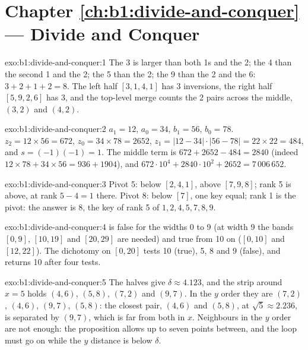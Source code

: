 \section*{Chapter \ref{ch:b1:divide-and-conquer} --- Divide and Conquer}

\begin{solution}{exo:b1:divide-and-conquer:1}
The 3 is larger than both 1s and the 2; the 4 than the second 1 and the 2; the 5 than the 2; the 9 than the 2 and the 6:
$3 + 2 + 1 + 2 = 8$. The left half $[3, 1, 4, 1]$ has 3 inversions, the right half $[5, 9, 2, 6]$ has 3, and the
top-level merge counts the 2 pairs across the middle, $(3, 2)$ and $(4, 2)$.
\end{solution}

\begin{solution}{exo:b1:divide-and-conquer:2}
$a_1 = 12$, $a_0 = 34$, $b_1 = 56$, $b_0 = 78$. $z_2 = 12 \times 56 = 672$, $z_0 = 34 \times 78 = 2652$, $z_1 = |12 -
34| \cdot |56 - 78| = 22 \times 22 = 484$, and $s = (-1)(-1) = 1$. The middle term is $672 + 2652 - 484 = 2840$ (indeed
$12 \times 78 + 34 \times 56 = 936 + 1904$), and $672 \cdot 10^4 + 2840 \cdot 10^2 + 2652 = 7\,006\,652$.
\end{solution}

\begin{solution}{exo:b1:divide-and-conquer:3}
Pivot 5: below $[2, 4, 1]$, above $[7, 9, 8]$; rank 5 is above, at rank $5 - 4 = 1$ there. Pivot 8: below $[7]$, one key
equal; rank 1 is the pivot: the answer is 8, the key of rank 5 of $1, 2, 4, 5, 7, 8, 9$.
\end{solution}

\begin{solution}{exo:b1:divide-and-conquer:4}
 is false for the widths 0 to 9 (at width 9 the bands $[0, 9]$, $[10, 19]$ and $[20, 29]$ are needed) and
true from 10 on ($[0, 10]$ and $[12, 22]$). The dichotomy on $[0, 20]$ tests 10 (true), 5, 8 and 9 (false), and returns
10 after four tests.
\end{solution}

\begin{solution}{exo:b1:divide-and-conquer:5}
The halves give $\delta \approx 4.123$, and the strip around $x = 5$ holds $(4, 6)$, $(5, 8)$, $(7, 2)$ and $(9, 7)$. In
the $y$ order they are $(7, 2)$, $(4, 6)$, $(9, 7)$, $(5, 8)$: the closest pair, $(4, 6)$ and $(5, 8)$, at $\sqrt5
\approx 2.236$, is separated by $(9, 7)$, which is far from both in $x$. Neighbours in the $y$ order are not enough: the
proposition allows up to seven points between, and the loop must go on while the $y$ distance is below $\delta$.
\end{solution}

